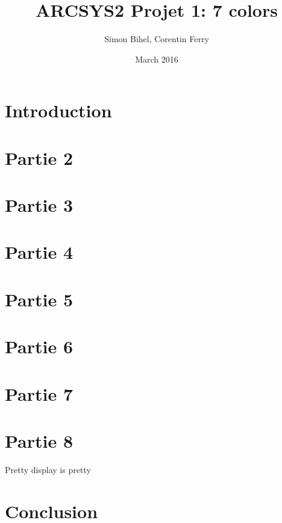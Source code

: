 \documentclass[a4paper]{article}
\title{ARCSYS2 Projet 1: 7 colors}
\author{Simon Bihel, Corentin Ferry}
\date{March 2016}
\begin{document}
	\maketitle
	
	\section{Introduction}
	
	\section{Partie 2}
	
	\section{Partie 3}
	
	\section{Partie 4}
	
	\section{Partie 5}
	
	\section{Partie 6}
	
	\section{Partie 7}
	
	\section{Partie 8}
	Pretty display is pretty
	
	\section{Conclusion}
	
\end{document}
